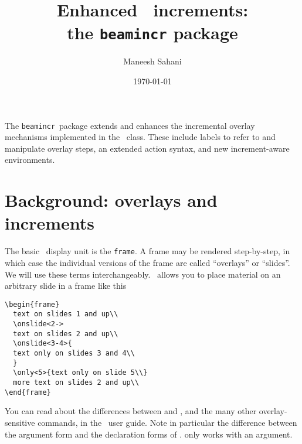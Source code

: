 \documentclass[a4paper]{ltxdoc}
\title{Enhanced \beamer\ increments:\\
the \texttt{beamincr} package}
\author{Maneesh Sahani}
\date{\today}
\def\beamincr{\texttt{beamincr}}
\begin{document}
\maketitle

\noindent
The \beamincr\ package extends and enhances the incremental overlay mechanisms
implemented in the \beamer\ class.  These include labels to refer to and
manipulate overlay steps, an extended action syntax, and new increment-aware
environments.

\section{Background: overlays and increments}

The basic \beamer\ display unit is the \texttt{frame}.  A
frame may be rendered step-by-step, in which case the individual
versions of the frame are called ``overlays'' or ``slides''.  We will
use these terms interchangeably.
%
\beamer\ allows you to place material on an arbitrary slide in a frame like this
\example
\begin{verbatim}
\begin{frame}
  text on slides 1 and up\\
  \onslide<2->
  text on slides 2 and up\\
  \onslide<3-4>{
  text only on slides 3 and 4\\
  } 
  \only<5>{text only on slide 5\\}
  more text on slides 2 and up\\
\end{frame}
\end{verbatim}
You can read about the differences between 
and , and the many other overlay-sensitive
commands, in the \beamer\ user guide.  Note in particular the
difference between the argument form and the declaration forms of
.   only works with an
argument.
\end{document}
